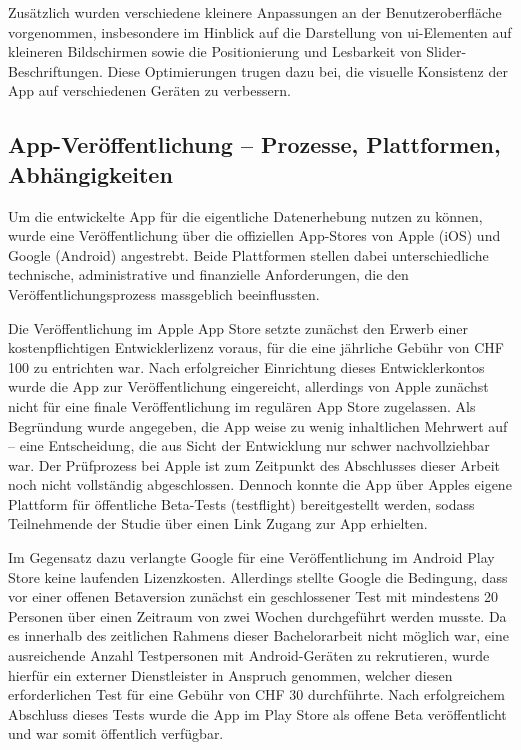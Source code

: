 Zusätzlich wurden verschiedene kleinere Anpassungen an der Benutzeroberfläche vorgenommen, insbesondere im Hinblick auf die Darstellung von \gls{ui}-Elementen auf kleineren Bildschirmen sowie die Positionierung und Lesbarkeit von Slider-Beschriftungen. Diese Optimierungen trugen dazu bei, die visuelle Konsistenz der App auf verschiedenen Geräten zu verbessern.

\subsection{App-Veröffentlichung -- Prozesse, Plattformen, Abhängigkeiten}

Um die entwickelte App für die eigentliche Datenerhebung nutzen zu können, wurde eine Veröffentlichung über die offiziellen App-Stores von Apple (iOS) und Google (Android) angestrebt. Beide Plattformen stellen dabei unterschiedliche technische, administrative und finanzielle Anforderungen, die den Veröffentlichungsprozess massgeblich beeinflussten.

Die Veröffentlichung im Apple App Store setzte zunächst den Erwerb einer kostenpflichtigen Entwicklerlizenz voraus, für die eine jährliche Gebühr von CHF 100 zu entrichten war. Nach erfolgreicher Einrichtung dieses Entwicklerkontos wurde die App zur Veröffentlichung eingereicht, allerdings von Apple zunächst nicht für eine finale Veröffentlichung im regulären App Store zugelassen. Als Begründung wurde angegeben, die App weise zu wenig inhaltlichen Mehrwert auf -- eine Entscheidung, die aus Sicht der Entwicklung nur schwer nachvollziehbar war. Der Prüfprozess bei Apple ist zum Zeitpunkt des Abschlusses dieser Arbeit noch nicht vollständig abgeschlossen. Dennoch konnte die App über Apples eigene Plattform für öffentliche Beta-Tests (\gls{testflight}) bereitgestellt werden, sodass Teilnehmende der Studie über einen Link Zugang zur App erhielten.

Im Gegensatz dazu verlangte Google für eine Veröffentlichung im Android Play Store keine laufenden Lizenzkosten. Allerdings stellte Google die Bedingung, dass vor einer offenen Betaversion zunächst ein geschlossener Test mit mindestens 20 Personen über einen Zeitraum von zwei Wochen durchgeführt werden musste. Da es innerhalb des zeitlichen Rahmens dieser Bachelorarbeit nicht möglich war, eine ausreichende Anzahl Testpersonen mit Android-Geräten zu rekrutieren, wurde hierfür ein externer Dienstleister in Anspruch genommen, welcher diesen erforderlichen Test für eine Gebühr von CHF 30 durchführte. Nach erfolgreichem Abschluss dieses Tests wurde die App im Play Store als offene Beta veröffentlicht und war somit öffentlich verfügbar.

